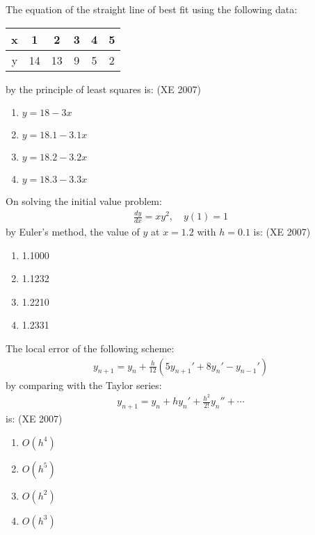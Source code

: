 \item The equation of the straight line of best fit using the following data:
    \begin{table}[h!]    
    \centering
    \begin{tabular}[12pt]{ |c| c| c| c| c| c|}
    \hline
    x & 1 & 2 & 3 & 4 & 5 \\ 
    \hline
    y & 14 & 13 & 9 & 5 & 2 \\
    \hline   
    \end{tabular}
    \end{table}
    by the principle of least squares is:
 \hfill{(XE 2007)}
 \begin{multicols}{4}
    \begin{enumerate}
        \item $y = 18 - 3x$
        \item $y = 18.1 - 3.1x$
        \item $y = 18.2 - 3.2x$
        \item $y = 18.3 - 3.3x$
    \end{enumerate}
    \end{multicols}
 \item On solving the initial value problem:
    \begin{align}
    \frac{dy}{dx} = xy^2, \quad y(1) = 1
    \end{align}    
    by Euler's method, the value of $y$ at $x = 1.2$ with $h = 0.1$ is:
  \hfill{(XE 2007)}
    \begin{multicols}{4}
    \begin{enumerate}
        \item 1.1000
        \item 1.1232
        \item 1.2210
        \item 1.2331    
    \end{enumerate}
   \end{multicols}
\item The local error of the following scheme:
   \begin{align}
    y_{n+1} = y_n + \frac{h}{12} \left( 5y_{n+1}' + 8y_n' - y_{n-1}' \right)
    \end{align}   
    by comparing with the Taylor series:
    \begin{align}
    y_{n+1} = y_n + hy_n' + \frac{h^2}{2!} y_n'' + \cdots
    \end{align}
    is:
 \hfill{(XE 2007)}
    \begin{multicols}{4}
    \begin{enumerate}
        \item $O(h^4)$
        \item $O(h^5)$
        \item $O(h^2)$
        \item $O(h^3)$
    \end{enumerate}
    \end{multicols}


